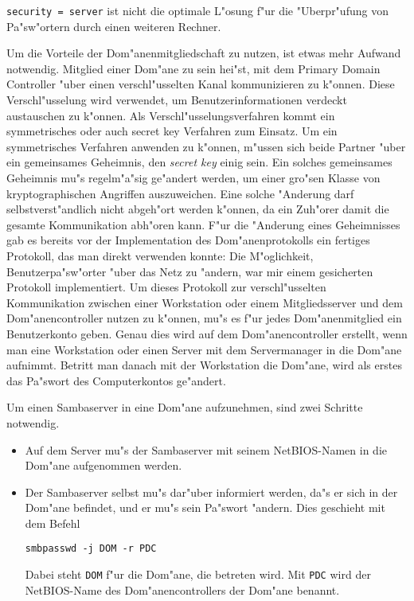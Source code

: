 \documentclass{scrartcl}
\newcommand{\param}{\texttt}
\begin{document}
\param{security = server} ist nicht die optimale L"osung f"ur die
"Uberpr"ufung von Pa"sw"ortern durch einen weiteren Rechner.

Um die Vorteile der Dom"anenmitgliedschaft zu nutzen, ist etwas mehr
Aufwand notwendig. Mitglied einer Dom"ane zu sein hei"st, mit dem
Primary Domain Controller "uber einen verschl"usselten Kanal
kommunizieren zu k"onnen. Diese Verschl"usselung wird verwendet, um
Benutzerinformationen verdeckt austauschen zu k"onnen. Als
Verschl"usselungsverfahren kommt ein symmetrisches oder auch secret
key Verfahren zum Einsatz. Um ein symmetrisches Verfahren anwenden zu
k"onnen, m"ussen sich beide Partner "uber ein gemeinsames Geheimnis,
den \emph{secret key} einig sein.  Ein solches gemeinsames Geheimnis
mu"s regelm"a"sig ge"andert werden, um einer gro"sen Klasse von
kryptographischen Angriffen auszuweichen. Eine solche "Anderung darf
selbstverst"andlich nicht abgeh"ort werden k"onnen, da ein Zuh"orer
damit die gesamte Kommunikation abh"oren kann. F"ur die "Anderung
eines Geheimnisses gab es bereits vor der Implementation des
Dom"anenprotokolls ein fertiges Protokoll, das man direkt verwenden
konnte: Die M"oglichkeit, Benutzerpa"sw"orter "uber das Netz zu
"andern, war mir einem gesicherten Protokoll implementiert. Um dieses
Protokoll zur verschl"usselten Kommunikation zwischen einer
Workstation oder einem Mitgliedsserver und dem Dom"anencontroller
nutzen zu k"onnen, mu"s es f"ur jedes Dom"anenmitglied ein
Benutzerkonto geben.  Genau dies wird auf dem Dom"anencontroller
erstellt, wenn man eine Workstation oder einen Server mit dem
Servermanager in die Dom"ane aufnimmt. Betritt man danach mit der
Workstation die Dom"ane, wird als erstes das Pa"swort des
Computerkontos ge"andert.

Um einen Sambaserver in eine Dom"ane aufzunehmen, sind zwei Schritte
notwendig.

\begin{itemize}
\item Auf dem Server mu"s der Sambaserver mit seinem NetBIOS-Namen in
  die Dom"ane aufgenommen werden.
\item Der Sambaserver selbst mu"s dar"uber informiert werden, da"s er
  sich in der Dom"ane befindet, und er mu"s sein Pa"swort "andern.
  Dies geschieht mit dem Befehl

\verb|smbpasswd -j DOM -r PDC|

Dabei steht \texttt{DOM} f"ur die Dom"ane, die betreten wird.  Mit
\texttt{PDC} wird der NetBIOS-Name des Dom"anencontrollers der Dom"ane
benannt.
\end{itemize}
\end{document}
